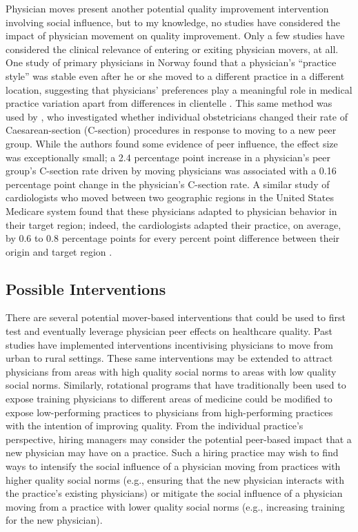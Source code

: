 \documentclass[11pt]{article}
\begin{document}
Physician moves present another potential quality improvement intervention involving social influence, but to my knowledge, no studies have considered the impact of physician movement on quality improvement. Only a few studies have considered the clinical relevance of entering or exiting physician movers, at all. One study of primary physicians in Norway found that a physician's ``practice style'' was stable even after he or she moved to a different practice in a different location, suggesting that physicians' preferences play a meaningful role in medical practice variation apart from differences in clientelle \citep{gryttenPracticeVariationPhysicianspecific2003}. This same method was used by \citet{epsteinFormationEvolutionPhysician2009}, who investigated whether individual obstetricians changed their rate of Caesarean-section (C-section) procedures in response to moving to a new peer group. While the authors found some evidence of peer influence, the effect size was exceptionally small; a 2.4 percentage point increase in a physician's peer group's C-section rate driven by moving physicians was associated with a 0.16 percentage point change in the physician's C-section rate. A similar study of cardiologists who moved between two geographic regions in the United States Medicare system found that these physicians adapted to physician behavior in their target region; indeed, the cardiologists adapted their practice, on average, by 0.6 to 0.8 percentage points for every percent point difference between their origin and target region \citep{molitorEvolutionPhysicianPractice2018}.

\subsection{Possible Interventions}

There are several potential mover-based interventions that could be used to first test and eventually leverage physician peer effects on healthcare quality. Past studies have implemented interventions incentivising physicians to move from urban to rural settings. These same interventions may be extended to attract physicians from areas with high quality social norms to areas with low quality social norms. Similarly, rotational programs that have traditionally been used to expose training physicians to different areas of medicine \citep{bell-dzideEffectLongtermCare2014} could be modified to expose low-performing practices to physicians from high-performing practices with the intention of improving quality. From the individual practice's perspective, hiring managers may consider the potential peer-based impact that a new physician may have on a practice. Such a hiring practice may wish to find ways to intensify the social influence of a physician moving from practices with higher quality social norms (e.g., ensuring that the new physician interacts with the practice's existing physicians) or mitigate the social influence of a physician moving from a practice with lower quality social norms (e.g., increasing training for the new physician).
\end{document}
